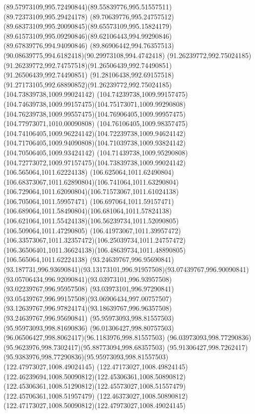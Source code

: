 {{	\curveto(89.57973109,995.72490844)(89.55839776,995.51557511)(89.72373109,995.29424178)
	\curveto(89.70639776,995.24757512)(89.68373109,995.20090845)(89.65573109,995.15824179)
	\curveto(89.61573109,995.09290846)(89.62106443,994.99290846)(89.67839776,994.94090846)
	\curveto(89.86906442,994.76357513)(90.08639775,994.6182418)(90.29973108,994.4742418)
	\moveto(91.26239772,992.75024185)
	\curveto(91.26239772,992.74757518)(91.26506439,992.74490851)(91.26506439,992.74490851)
	\curveto(91.28106438,992.69157518)(91.27173105,992.68890852)(91.26239772,992.75024185)
	\moveto(104.73839738,1009.99024142)
	\curveto(104.74239738,1009.99157475)(104.74639738,1009.99157475)(104.75173071,1009.99290808)
	\curveto(104.76239738,1009.99557475)(104.76906405,1009.99957475)(104.77973071,1010.00090808)
	\curveto(104.76106405,1009.98357475)(104.74106405,1009.96224142)(104.72239738,1009.94624142)
	\curveto(104.71706405,1009.94090808)(104.71039738,1009.93824142)(104.70506405,1009.93424142)
	\curveto(104.71439738,1009.95290808)(104.72773072,1009.97157475)(104.73839738,1009.99024142)
	\moveto(106.565064,1011.62224138)
	\curveto(106.625064,1011.62490804)(106.68373067,1011.62890804)(106.741064,1011.63290804)
	\curveto(106.729064,1011.62090804)(106.71573067,1011.61024138)(106.705064,1011.59957471)
	\curveto(106.697064,1011.59157471)(106.689064,1011.58490804)(106.681064,1011.57824138)
	\curveto(106.621064,1011.55424138)(106.56239734,1011.52090805)(106.509064,1011.47290805)
	\curveto(106.41973067,1011.39957472)(106.33573067,1011.32357472)(106.25039734,1011.24757472)
	\curveto(106.36506401,1011.36624138)(106.48639734,1011.48890805)(106.565064,1011.62224138)
	\moveto(93.24639767,996.95690841)
	\curveto(93.187731,996.93690841)(93.13173101,996.91957508)(93.07439767,996.90090841)
	\curveto(93.05706434,996.92090841)(93.03973101,996.93957508)(93.02239767,996.95957508)
	\curveto(93.03973101,996.97290841)(93.05439767,996.99157508)(93.06906434,997.00757507)
	\curveto(93.12639767,996.97824174)(93.18639767,996.96357508)(93.24639767,996.95690841)
	\moveto(95.95973093,998.81557503)
	\lineto(95.95973093,998.81690836)
	\curveto(96.01306427,998.80757503)(96.06506427,998.8062417)(96.1183976,998.81557503)
	\curveto(96.03973093,998.77290836)(95.9623976,998.7302417)(95.88773094,998.68357503)
	\curveto(95.91306427,998.7262417)(95.9383976,998.77290836)(95.95973093,998.81557503)
	\moveto(122.47973027,1008.49024145)
	\curveto(122.47173027,1008.49824145)(122.46239694,1008.50090812)(122.45306361,1008.50890812)
	\curveto(122.45306361,1008.51290812)(122.45573027,1008.51557479)(122.45706361,1008.51957479)
	\curveto(122.46373027,1008.50890812)(122.47173027,1008.50090812)(122.47973027,1008.49024145)
}}

